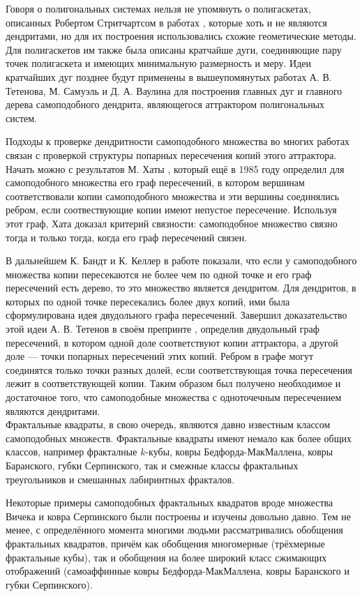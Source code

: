 Говоря о полигональных системах нельзя не упомянуть о полигаскетах, описанных Робертом Стритчартсом в работах \cite{strich1999, Strichartz1999}, которые хоть и не являются дендритами, но для их построения использовались схожие геометические методы.
Для полигаскетов им также была описаны кратчайше дуги, соединяющие пару точек полигаскета и имеющих минимальную размерность и меру.
Идеи кратчайших дуг позднее будут применены в вышеупомянутых работах \cite{TSV2017, STV2017} А. В. Тетенова, М. Самуэль и Д. А. Ваулина для построения главных дуг и главного дерева самоподобного дендрита, являющегося аттрактором полигональных систем.

Подходы к проверке дендритности самоподобного множества во многих работах связан с проверкой структуры попарных пересечения копий этого аттрактора.
Начать можно с результатов М. Хаты \cite{Hata1985}, который ещё в 1985 году определил для самоподобного множества его граф пересечений, в котором вершинам соответствовали копии самоподобного множества и эти вершины соединялись ребром, если соотвествующие копии имеют непустое пересечение.
Используя этот граф, Хата доказал критерий связности: самоподобное множество связно тогда и только тогда, когда его граф пересечений связен.

В дальнейшем К. Бандт и К. Келлер в работе \cite{SSS2} показали, что если у самоподобного множества копии пересекаются не более чем по одной точке и его граф пересечений есть дерево, то это множество является дендритом. Для дендритов, в которых по одной точке пересекались более двух копий, ими была сформулирована идея двудольного графа пересечений. 
Завершил доказательство этой идеи А. В. Тетенов в своём препринте \cite{FIP}, определив двудольный граф пересечений, в котором одной доле соответствуют копии аттрактора, а другой доле --- точки попарных пересечений этих копий. Ребром в графе могут соединятся только точки разных долей, если соответствующая точка пересечения лежит в соответствующей копии.
Таким образом был получено необходимое и достаточное того, что самоподобные множества с одноточечным пересечением являются дендритами.\\

Фрактальные квадраты, в свою очередь, являются давно известным классом самоподобных множеств.
Фрактальные квадраты имеют немало как более общих классов, например фракталные $k$-кубы, ковры Бедфорда-МакМаллена, ковры Баранского, губки Серпинского, так и смежные классы фрактальных треугольников и смешанных лабиринтных фракталов.

Некоторые примеры самоподобных фрактальных квадратов вроде множества Вичека и ковра Серпинского были построены и изучены довольно давно.
Тем не менее, с определённого момента многими людьми рассматривались обобщения фрактальных квадратов, причём как обобщения многомерные (трёхмерные фрактальные кубы), так и обобщения на более широкий класс сжимающих отображений (самоаффинные ковры Бедфорда-МакМаллена, ковры Баранского и губки Серпинского).

